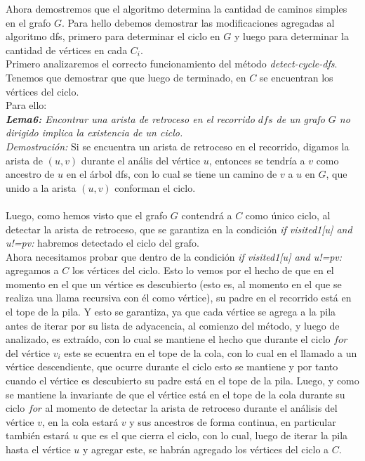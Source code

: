 \documentclass[12pt]{article}
\begin{document}
Ahora demostremos que el algoritmo determina la cantidad de caminos simples en el grafo $G$. Para hello debemos demostrar las modificaciones 
agregadas al algoritmo dfs, primero para determinar el ciclo en $G$ y luego para determinar la cantidad de v\'ertices en cada $C_i$.\\ 
Primero analizaremos el correcto funcionamiento del m\'etodo \textit{detect-cycle-dfs}. Tenemos que demostrar que que luego de terminado, en $C$ se encuentran los v\'ertices del ciclo.\\
Para ello:\\

\textit{\textbf{Lema6:}
Encontrar una arista de retroceso en el recorrido $dfs$ de un grafo $G$ no dirigido implica la existencia de un ciclo.}\\
\textit{Demostraci\'on:} Si se encuentra un arista de retroceso en el recorrido, digamos la arista de $(u,v)$ durante el an\'alis del 
v\'ertice $u$, entonces se tendr\'ia a $v$ como ancestro de $u$ en el \'arbol dfs, con lo cual se tiene un camino de $v$ a $u$ en $G$, que 
unido a la arista $(u,v)$ conforman el ciclo.\\
\\

Luego, como hemos visto que el grafo $G$ contendr\'a a $C$ como \'unico ciclo, al detectar la arista de retroceso, que se garantiza en 
la condici\'on \textit{ if visited1[u] and u!=pv:} habremos detectado el ciclo del grafo. \\
Ahora necesitamos probar que dentro de la condici\'on \textit{ if visited1[u] and u!=pv:} agregamos a $C$ los v\'ertices del ciclo. 
Esto lo vemos por el hecho de que en el momento en el que un v\'ertice es descubierto (esto es, al momento en el que se realiza una llama 
recursiva con \'el como v\'ertice), su padre en el recorrido est\'a en el tope de la pila. Y esto se garantiza, ya que cada v\'ertice se agrega a la pila antes de iterar por su lista de adyacencia, al comienzo del m\'etodo, y luego de analizado, es extra\'ido, con lo cual se mantiene el hecho que durante el ciclo $for$ del v\'ertice $v_i$ este se ecuentra en el tope de la cola, con lo cual en el llamado a un v\'ertice descendiente, que ocurre durante el ciclo esto se mantiene y por tanto cuando el v\'ertice es descubierto su padre est\'a en el tope de la pila. Luego, y como se mantiene la invariante de que el v\'ertice est\'a en el tope de la cola durante su ciclo $for$ al momento de 
detectar la arista de retroceso durante el an\'alisis del v\'ertice $v$, en la cola estar\'a $v$ y sus ancestros de forma continua, 
en particular tambi\'en estar\'a $u$ que es el que cierra el ciclo, con lo cual, luego de iterar la pila hasta el v\'ertice $u$ y agregar este,
 se habr\'an agregado los v\'ertices del ciclo a $C$.\\
\\
\end{document}
